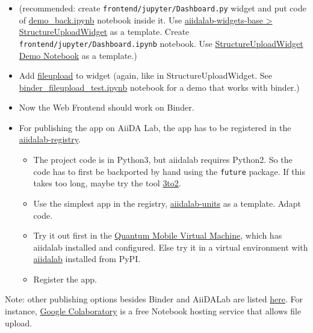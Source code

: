 \documentclass[]{article}
\providecommand{\tightlist}{%
  \setlength{\itemsep}{0pt}\setlength{\parskip}{0pt}}
\begin{document}
\begin{itemize}
\tightlist
\item
  (recommended: create \texttt{frontend/jupyter/Dashboard.py} widget and
  put code of
  \href{./frontend/jupyter/demo/demo_backend.ipynb}{demo\_back.ipynb}
  notebook inside it. Use
  \href{https://github.com/aiidalab/aiidalab-widgets-base/blob/master/aiidalab_widgets_base/structures.py}{aiidalab-widgets-base
  \textgreater{} StructureUploadWidget} as a template. Create
  \texttt{frontend/jupyter/Dashboard.ipynb} notebook. Use
  \href{https://github.com/aiidalab/aiidalab-widgets-base/blob/master/structures.ipynb}{StructureUploadWidget
  Demo Notebook} as a template.)
\item
  Add \href{https://pypi.org/project/fileupload/}{fileupload} to widget
  (again, like in StructureUploadWidget. See
  \href{./frontend/jupyter/demo/binder_fileupload_test.ipynb}{binder\_fileupload\_test.ipynb}
  notebook for a demo that works with binder.)
\item
  Now the Web Frontend should work on Binder.
\item
  For publishing the app on AiiDA Lab, the app has to be registered in
  the
  \href{https://github.com/aiidalab/aiidalab-registry}{aiidalab-registry}.

  \begin{itemize}
  \tightlist
  \item
    The project code is in Python3, but aiidalab requires Python2. So
    the code has to first be backported by hand using the
    \texttt{future} package. If this takes too long, maybe try the tool
    \href{https://pypi.org/project/3to2/}{3to2}.
  \item
    Use the simplest app in the registry,
    \href{https://github.com/aiidalab/aiidalab-units}{aiidalab-units} as
    a template. Adapt code.
  \item
    Try it out first in the
    \href{https://www.materialscloud.org/work/quantum-mobile}{Quantum
    Mobile Virtual Machine}, which has aiidalab installed and
    configured. Else try it in a virtual environment with
    \href{https://pypi.org/project/aiidalab/}{aiidalab} installed from
    PyPI.
  \item
    Register the app.
  \end{itemize}
\end{itemize}

Note: other publishing options besides Binder and AiiDALab are listed
\href{https://github.com/markusschanta/awesome-jupyter}{here}. For
instance, \href{http://colab.research.google.com/}{Google Colaboratory}
is a free Notebook hosting service that allows file upload.
\end{document}
